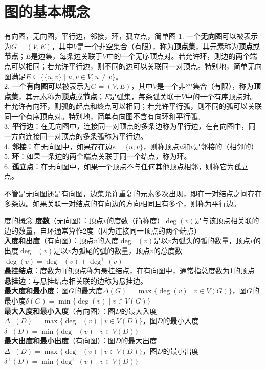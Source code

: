 \documentclass[lang=cn,11pt]{elegantbook}
\begin{document}
\section{图的基本概念}
\begin{definition}{有向图，无向图，平行边，邻接，环，孤立点，简单图}
1. 一个\textbf{无向图}可以被表示为$G = (V, E)$，其中$V$是一个非空集合（有限），称为\textbf{顶点集}，其元素称为\textbf{顶点}或\textbf{节点}；$E$是边集，每条边关联于$V$中的一个无序顶点对。若允许环，则边的两个端点可以相同；若允许平行边，则不同的边可以关联同一对顶点。特别地，简单无向图满足$E \subseteq \{\{u,v\} \mid u,v \in V, u \neq v\}$。\\
2. 一个\textbf{有向图}可以被表示为$G = (V, E)$，其中$V$是一个非空集合（有限），称为\textbf{顶点集}，其元素称为\textbf{顶点}或\textbf{节点}；$E$是弧集，每条弧关联于$V$中的一个有序顶点对。若允许有向环，则弧的起点和终点可以相同；若允许平行弧，则不同的弧可以关联同一个有序顶点对。特别地，简单有向图不含有向环和平行弧。\\
3.  \textbf{平行边}：在无向图中，连接同一对顶点的多条边称为平行边，在有向图中，同一方向连接同一对顶点的多条弧称为平行边。\\
4. \textbf{邻接}：在无向图中，如果存在边$e = \{u,v\}$，则称顶点$u$和$v$是邻接的（相邻的）\\
5. \textbf{环}：如果一条边的两个端点关联于同一个结点，称为环。\\
6. \textbf{孤立点}：在无向图中，如果一个顶点不与任何其他顶点相邻，则称它为孤立点。
\end{definition}
不管是无向图还是有向图，边集允许重复的元素多次出现，即在一对结点之间存在多条边。如果关联一对结点的有向边的方向相同且有多个，则称为平行边。
\begin{definition}{度的概念}
\textbf{度数}（无向图）：顶点$v$的度数（简称度）$\deg(v)$是与该顶点相关联的边的数量，自环通常算作2度（因为连接同一顶点的两个端点）\\
\textbf{入度和出度}（有向图）：顶点$v$的入度$\deg^-(v)$是以$v$为弧头的弧的数量，顶点$v$的出度$\deg^+(v)$是以$v$为弧尾的弧的数量，顶点$v$的总度数$\deg(v) = \deg^-(v) + \deg^+(v)$\\
\textbf{悬挂结点}：度数为1的顶点称为悬挂结点，在有向图中，通常指总度数为1的顶点\\
\textbf{悬挂边}：与悬挂结点相关联的边称为悬挂边。\\
\textbf{最大度和最小度}：图$G$的最大度$\Delta(G) = \max\{\deg(v) \mid v \in V(G)\}$，图$G$的最小度$\delta(G) = \min\{\deg(v) \mid v \in V(G)\}$\\
\textbf{最大入度和最小入度}（有向图）：图$D$的最大入度$\Delta^-(D) = \max\{\deg^-(v) \mid v \in V(D)\}$，图$D$的最小入度$\delta^-(D) = \min\{\deg^-(v) \mid v \in V(D)\}$\\
\textbf{最大出度和最小出度}（有向图）：图$D$的最大出度$\Delta^+(D) = \max\{\deg^+(v) \mid v \in V(D)\}$，图$D$的最小出度$\delta^+(D) = \min\{\deg^+(v) \mid v \in V(D)\}$
\end{definition}
\end{document}
